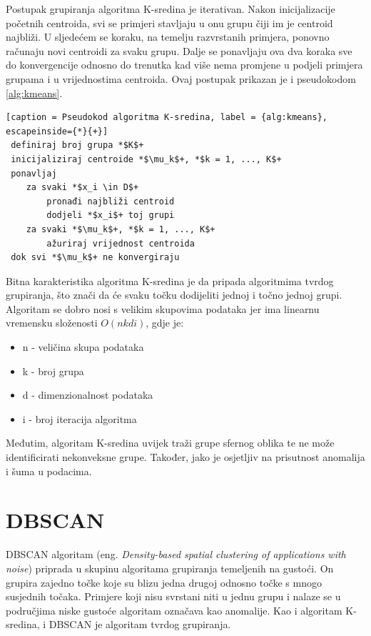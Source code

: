 \documentclass[utf8, diplomski, numeric]{fer}
\begin{document}
Postupak grupiranja algoritma K-sredina je iterativan. Nakon inicijalizacije početnih centroida, svi se primjeri stavljaju u onu grupu čiji im je centroid najbliži. U sljedećem se koraku, na temelju razvrstanih primjera, ponovno računaju novi centroidi za svaku grupu. Dalje se ponavljaju ova dva koraka sve do konvergencije odnosno do trenutka kad više nema promjene u podjeli primjera grupama i u vrijednostima centroida. Ovaj postupak prikazan je i pseudokodom \ref{alg:kmeans}.

 \begin{lstlisting}[caption = Pseudokod algoritma K-sredina, label = {alg:kmeans}, escapeinside={*}{+}]
 definiraj broj grupa *$K$+
 inicijaliziraj centroide *$\mu_k$+, *$k = 1, ..., K$+
 ponavljaj
 	za svaki *$x_i \in D$+
 		pronađi najbliži centroid
 		dodjeli *$x_i$+ toj grupi
	za svaki *$\mu_k$+, *$k = 1, ..., K$+
		ažuriraj vrijednost centroida
 dok svi *$\mu_k$+ ne konvergiraju
\end{lstlisting}

Bitna karakteristika algoritma K-sredina je da pripada algoritmima tvrdog grupiranja, što znači da će svaku točku dodijeliti jednoj i točno jednoj grupi. Algoritam se dobro nosi s velikim skupovima podataka jer ima linearnu vremensku složenosti $O(nkdi)$, gdje je:
\begin{itemize}
\item n - veličina skupa podataka
\item k - broj grupa
\item d - dimenzionalnost podataka
\item i - broj iteracija algoritma
\end{itemize}

Međutim, algoritam K-sredina uvijek traži grupe sfernog oblika te ne može identificirati nekonveksne grupe. Također, jako je osjetljiv na prisutnost anomalija i šuma u podacima.

\section{DBSCAN}
DBSCAN algoritam (eng. \textit{Density-based spatial clustering of applications with noise}) priprada u skupinu algoritama grupiranja temeljenih na gustoći. On grupira zajedno točke koje su blizu jedna drugoj odnosno točke s mnogo susjednih točaka. Primjere koji nisu svrstani niti u jednu grupu i nalaze se u područjima niske gustoće algoritam označava kao anomalije. Kao i algoritam K-sredina, i DBSCAN je algoritam tvrdog grupiranja.
\end{document}
